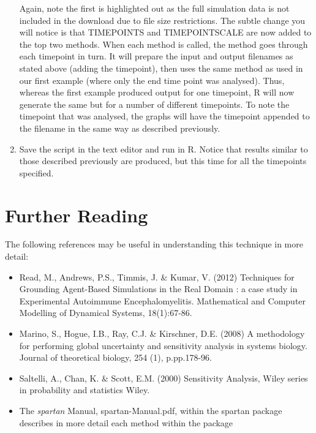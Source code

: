 \documentclass[a4paper,11pt]{article}
\begin{document}
\begin{enumerate}
Again, note the first is highlighted out as the full simulation data is not included in the download due to file size restrictions. The subtle change you will notice is that TIMEPOINTS and TIMEPOINTSCALE are now added to the top two methods. When each method is called, the method goes through each timepoint in turn. It will prepare the input and output filenames as stated above (adding the timepoint), then uses the same method as used in our first example (where only the end time point was analysed).  Thus, whereas the first example produced output for one timepoint, R will now generate the same but for a number of different timepoints. To note the timepoint that was analysed, the graphs will have the timepoint appended to the filename in the same way as described previously.

\item Save the script in the text editor and run in R.  Notice that results similar to those described previously are produced, but this time for all the timepoints specified.

\end{enumerate}

\section{Further Reading}
\noindent
The following references may be useful in understanding this technique in more detail:
\begin{itemize}
\item Read, M., Andrews, P.S., Timmis, J. \& Kumar, V. (2012) Techniques for Grounding Agent-Based Simulations in the Real Domain : a case study in Experimental Autoimmune Encephalomyelitis. Mathematical and Computer Modelling of Dynamical Systems, 18(1):67-86.
\item Marino, S., Hogue, I.B., Ray, C.J. \& Kirschner, D.E. (2008) A methodology for performing global uncertainty and sensitivity analysis in systems biology. Journal of theoretical biology, 254 (1), p.pp.178-96.
\item Saltelli, A., Chan, K. \& Scott, E.M. (2000) Sensitivity Analysis, Wiley series in probability and statistics Wiley.
\item The \textit{spartan} Manual, spartan-Manual.pdf, within the spartan package describes in more detail each method within the package
\end{itemize}
\end{document}
